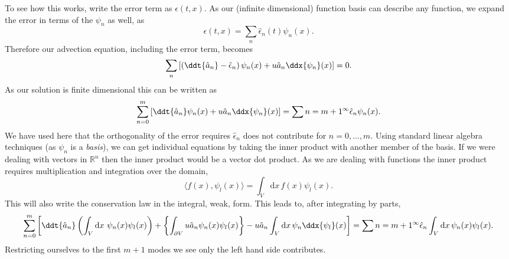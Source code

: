 To see how this works, write the error term as $\epsilon(t, x)$.
As our (infinite dimensional) function basis can describe any function, we
expand the error in terms of the $\psi_n$ as well, as
%
\begin{equation}
  \label{eq:dg_error}
  \epsilon(t, x) = \sum_n \hat{\epsilon}_n(t) \psi_n(x).
\end{equation}
%
Therefore our advection equation, including the error term, becomes
%
\begin{equation}
  \label{eq:dg_advection}
  \sum_n \left[ \left( \ddt{\hat{a}_n} - \hat{\epsilon}_n \right) \psi_n(x) +
  u \hat{a}_n \ddx{\psi_n}(x) \right] = 0.
\end{equation}
%
As our solution is finite dimensional this can be written as
%
\begin{equation}
  \label{eq:dg_advection2}
  \sum_{n=0}^{m} \left[ \ddt{\hat{a}_n} \psi_n(x) +
  u \hat{a}_n \ddx{\psi_n}(x) \right] = \sum{n=m+1}^{\infty} \hat{\epsilon}_n \psi_n(x).
\end{equation}
%
We have used here that the orthogonality of the error requires $\hat{\epsilon}_n$
does not contribute for $n = 0, \dots, m$.
Using standard linear algebra techniques (as $\psi_n$ is a \emph{basis}), we can
get individual equations by taking the inner product with another member of the
basis. If we were dealing with vectors in $\mathbb{R}^n$ then the inner product
would be a vector dot product. As we are dealing with functions the inner
product requires multiplication and integration over the domain,
%
\begin{equation}
  \label{eq:dg_inner_product}
  \langle f(x), \psi_l(x) \rangle = \int_V \text{d} x \, f(x) \psi_l(x).
\end{equation}
%
This will also write the conservation law in the integral, weak, form.
This leads to, after integrating by parts,
%
\begin{equation}
  \label{eq:dg_advection2}
  \sum_{n=0}^{m} \left[ \ddt{\hat{a}_n} \left( \int_V \text{d} x \ \psi_n(x) \psi_l(x) \right) + \left\{ \int_{\partial V} u \hat{a}_n \psi_n(x) \psi_l(x) \right\} -
  u \hat{a}_n \int_V \text{d} x \, \psi_n \ddx{\psi_l }(x) \right] = \sum{n=m+1}^{\infty} \hat{\epsilon}_n \int_V \text{d} x\, \psi_n(x) \psi_l(x).
\end{equation}
%
Restricting ourselves to the first $m+1$ modes we see only the left hand side
contributes.

